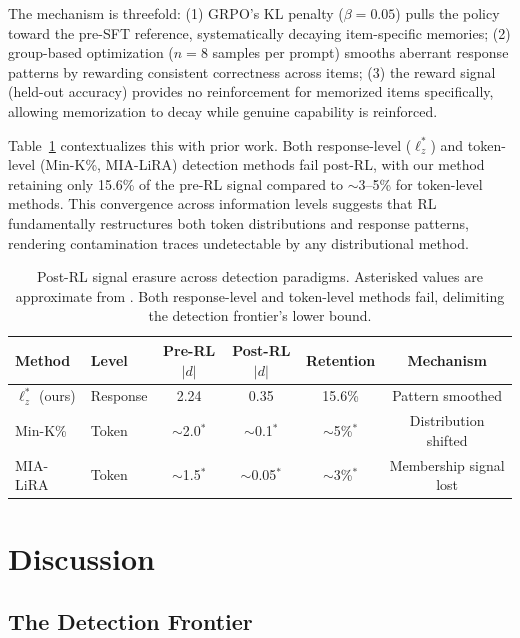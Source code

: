 \documentclass[11pt,a4paper]{article}
\begin{document}
The mechanism is threefold: (1) GRPO's KL penalty ($\beta=0.05$) pulls the policy toward the pre-SFT reference, systematically decaying item-specific memories; (2) group-based optimization ($n=8$ samples per prompt) smooths aberrant response patterns by rewarding consistent correctness across items; (3) the reward signal (held-out accuracy) provides no reinforcement for memorized items specifically, allowing memorization to decay while genuine capability is reinforced.

Table~\ref{tab:rl-comparison} contextualizes this with prior work.
Both response-level ($\ell_z^{*}$) and token-level (Min-K\%, MIA-LiRA) detection methods fail post-RL, with our method retaining only 15.6\% of the pre-RL signal compared to $\sim$3--5\% for token-level methods.
This convergence across information levels suggests that RL fundamentally restructures both token distributions and response patterns, rendering contamination traces undetectable by any distributional method.

\begin{table}[t]
\centering
\caption{Post-RL signal erasure across detection paradigms. Asterisked values are approximate from \citet{wang2025rlmia}. Both response-level and token-level methods fail, delimiting the detection frontier's lower bound.}
\label{tab:rl-comparison}
\small
\begin{tabular}{llcccc}
\toprule
\textbf{Method} & \textbf{Level} & \textbf{Pre-RL $|d|$} & \textbf{Post-RL $|d|$} & \textbf{Retention} & \textbf{Mechanism} \\
\midrule
$\ell_z^{*}$ (ours) & Response & 2.24 & 0.35 & 15.6\% & Pattern smoothed \\
Min-K\%            & Token    & $\sim$2.0$^*$ & $\sim$0.1$^*$ & $\sim$5\%$^*$ & Distribution shifted \\
MIA-LiRA           & Token    & $\sim$1.5$^*$ & $\sim$0.05$^*$ & $\sim$3\%$^*$ & Membership signal lost \\
\bottomrule
\end{tabular}
\end{table}

\section{Discussion}
\label{sec:discussion}

\subsection{The Detection Frontier}
\end{document}
